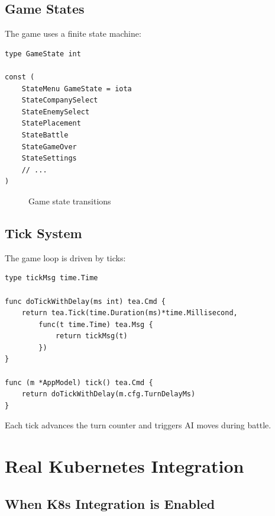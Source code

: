 \documentclass[11pt]{article}
\begin{document}
\subsection{Game States}

The game uses a finite state machine:

\begin{lstlisting}
type GameState int

const (
    StateMenu GameState = iota
    StateCompanySelect
    StateEnemySelect
    StatePlacement
    StateBattle
    StateGameOver
    StateSettings
    // ...
)
\end{lstlisting}

\begin{figure}[H]
    \centering
    \caption{Game state transitions}
    \label{fig:states}
\end{figure}

\subsection{Tick System}

The game loop is driven by ticks:

\begin{lstlisting}
type tickMsg time.Time

func doTickWithDelay(ms int) tea.Cmd {
    return tea.Tick(time.Duration(ms)*time.Millisecond,
        func(t time.Time) tea.Msg {
            return tickMsg(t)
        })
}

func (m *AppModel) tick() tea.Cmd {
    return doTickWithDelay(m.cfg.TurnDelayMs)
}
\end{lstlisting}

Each tick advances the turn counter and triggers AI moves during battle.


\section{Real Kubernetes Integration}


\subsection{When K8s Integration is Enabled}
\end{document}
